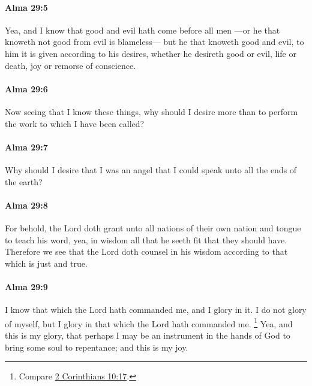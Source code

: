 		\paragraph{Alma 29:5} %
			\label{ALMA-29-5}

			Yea, and I know that good and evil hath come before all men
			---or he that knoweth not good from evil is blameless---
			but he that knoweth good and evil,
			to him it is given according to his desires,
			whether he desireth good or evil, life or death, joy or remorse of conscience.

		\paragraph{Alma 29:6} %
			\label{ALMA-29-6}

			Now seeing that I know these things,
			why should I desire more
			than to perform the work to which I have been called?

		\paragraph{Alma 29:7} %
			\label{ALMA-29-7}

			Why should I desire that I was an angel
			that I could speak unto all the ends of the earth?

		\paragraph{Alma 29:8} %
			\label{ALMA-29-8}

			For behold, the Lord doth grant
			unto all nations of their own nation and tongue
			to teach his word,
			yea, in wisdom all that he seeth fit that they should have.
			Therefore we see that the Lord doth counsel in his wisdom
			according to that which is just and true.

		\paragraph{Alma 29:9} %
			\label{ALMA-29-9}

			I know that which the Lord hath commanded me,
			and I glory in it.
			I do not glory of myself,
			but I glory in that which the Lord hath commanded me.%
				\footnote{%
					Compare \hyperref[2CORINTHIANS-10-17]{2 Corinthians 10:17}.
					}
			Yea, and this is my glory,
			that perhaps I may be an instrument in the hands of God
			to bring some soul to repentance;
			and this is my joy.

